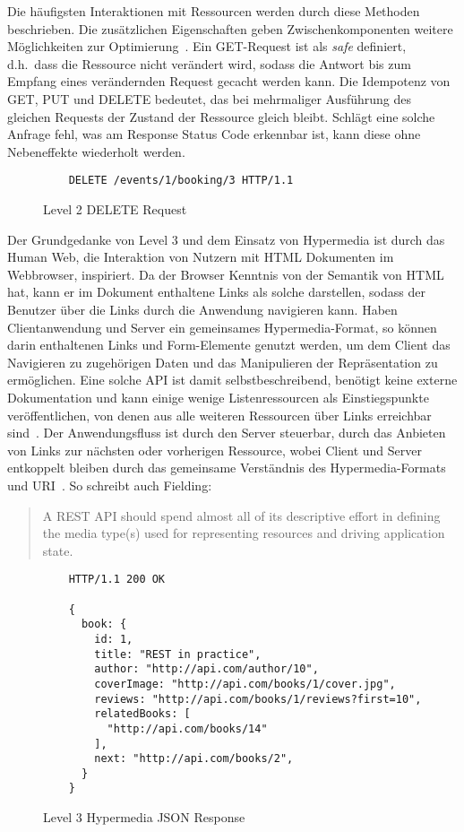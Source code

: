 \par
Die häufigsten Interaktionen mit Ressourcen werden durch diese Methoden beschrieben.
Die zusätzlichen Eigenschaften geben Zwischenkomponenten weitere Möglichkeiten zur Optimierung~\cite[vgl.][]{Richardson}.
Ein GET-Request ist als \emph{safe} definiert, d.h.\ dass die Ressource nicht verändert wird, sodass die Antwort bis zum Empfang eines verändernden Request gecacht werden kann.
Die Idempotenz von GET, PUT und DELETE bedeutet, das bei mehrmaliger Ausführung des gleichen Requests der Zustand der Ressource gleich bleibt.
Schlägt eine solche Anfrage fehl, was am Response Status Code erkennbar ist, kann diese ohne Nebeneffekte wiederholt werden.
\begin{figure}[h]
  \centering
  \begin{verbatim}
    DELETE /events/1/booking/3 HTTP/1.1
  \end{verbatim}
  \caption{Level 2 DELETE Request}\label{code:lvl2}
\end{figure}
\par
Der Grundgedanke von Level 3 und dem Einsatz von Hypermedia ist durch das Human Web, die Interaktion von Nutzern mit HTML Dokumenten im Webbrowser, inspiriert.
Da der Browser Kenntnis von der Semantik von HTML hat, kann er im Dokument enthaltene Links als solche darstellen, sodass der Benutzer über die Links durch die Anwendung navigieren kann.
Haben Clientanwendung und Server ein gemeinsames Hypermedia-Format, so können darin enthaltenen Links und Form-Elemente genutzt werden, um dem Client das Navigieren zu zugehörigen Daten und das Manipulieren der Repräsentation zu ermöglichen.
Eine solche API ist damit selbstbeschreibend, benötigt keine externe Dokumentation und kann einige wenige Listenressourcen als Einstiegspunkte veröffentlichen, von denen aus alle weiteren Ressourcen über Links erreichbar sind~\cite[vgl.][78]{Tilkov}.
Der Anwendungsfluss ist durch den Server steuerbar, \zB{} durch das Anbieten von Links zur nächsten oder vorherigen Ressource, wobei Client und Server entkoppelt bleiben durch das gemeinsame Verständnis des Hypermedia-Formats und URI~\cite[vgl.][]{Richardson}.
So schreibt auch Fielding:
\blockcquote{fieldBlog}{A REST API should spend almost all of its descriptive effort in defining the media type(s) used for representing resources and driving application state.}
\begin{figure}[h]
  \centering
  \begin{verbatim}
    HTTP/1.1 200 OK
  
    {
      book: {
        id: 1,
        title: "REST in practice",
        author: "http://api.com/author/10",
        coverImage: "http://api.com/books/1/cover.jpg",
        reviews: "http://api.com/books/1/reviews?first=10",
        relatedBooks: [
          "http://api.com/books/14"
        ],
        next: "http://api.com/books/2",
      }
    }
  \end{verbatim}
  \caption{Level 3 Hypermedia JSON Response}\label{code:lvl3}
\end{figure}

